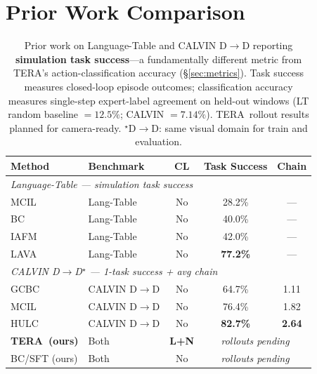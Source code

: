 \documentclass{article}
\renewcommand{\arraystretch}{1.25}
\newcommand{\modelname}{\textsc{TERA}\xspace}
\begin{document}
\section{Prior Work Comparison}
\label{app:prior}

\begin{table}[h]
\centering
\caption{Prior work on Language-Table and CALVIN D$\to$D reporting
  \textbf{simulation task success}---a fundamentally different metric from
  \modelname's action-classification accuracy (\S\ref{sec:metrics}).
  Task success measures closed-loop episode outcomes; classification accuracy
  measures single-step expert-label agreement on held-out windows
  (LT random baseline $= 12.5\%$; CALVIN $= 7.14\%$).
  \modelname\ rollout results planned for camera-ready.
  $^\star$D$\to$D: same visual domain for train and evaluation.}
\label{tab:prior_comparison}
\small
\setlength{\tabcolsep}{4pt}
\renewcommand{\arraystretch}{1.2}
\begin{tabular}{llccc}
\toprule
\textbf{Method} & \textbf{Benchmark} & \textbf{CL} & \textbf{Task Success} & \textbf{Chain} \\
\midrule
\multicolumn{5}{l}{\textit{Language-Table — simulation task success}} \\
MCIL~\citep{durante2024agent}              & Lang-Table & No & 28.2\% & — \\
BC~\citep{durante2024agent}                & Lang-Table & No & 40.0\% & — \\
IAFM~\citep{durante2024agent}              & Lang-Table & No & 42.0\% & — \\
LAVA~\citep{lynch2023languagetable}        & Lang-Table & No & \textbf{77.2\%} & — \\
\midrule
\multicolumn{5}{l}{\textit{CALVIN D$\to$D$^\star$ — 1-task success + avg chain}} \\
GCBC~\citep{mees2022hulc}                  & CALVIN D$\to$D & No & 64.7\% & 1.11 \\
MCIL~\citep{mees2022hulc}                  & CALVIN D$\to$D & No & 76.4\% & 1.82 \\
HULC~\citep{mees2022hulc}                  & CALVIN D$\to$D & No & \textbf{82.7\%} & \textbf{2.64} \\
\midrule
\textbf{\modelname\ (ours)}                & Both & \textbf{L+N} & \multicolumn{2}{c}{\textit{rollouts pending}} \\
BC/SFT (ours)                              & Both & No & \multicolumn{2}{c}{\textit{rollouts pending}} \\
\bottomrule
\end{tabular}
\end{table}
\end{document}
